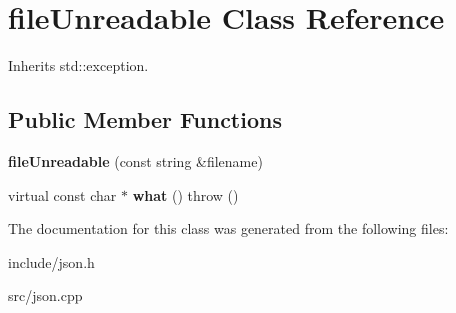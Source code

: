 \hypertarget{classfileUnreadable}{\section{file\-Unreadable \-Class \-Reference}
\label{classfileUnreadable}
}


\-Inherits std\-::exception.

\subsection*{\-Public \-Member \-Functions}
\begin{DoxyCompactItemize}
\item 
\hypertarget{classfileUnreadable_aa9b868ff8dc3d708a72eeb3de8f663f3}{{\bfseries file\-Unreadable} (const string \&filename)}\label{classfileUnreadable_aa9b868ff8dc3d708a72eeb3de8f663f3}

\item 
\hypertarget{classfileUnreadable_aa3c09e78f15e2091c2eca10b3d4cf86c}{virtual const char $\ast$ {\bfseries what} ()  throw ()}\label{classfileUnreadable_aa3c09e78f15e2091c2eca10b3d4cf86c}

\end{DoxyCompactItemize}


\-The documentation for this class was generated from the following files\-:\begin{DoxyCompactItemize}
\item 
include/json.\-h\item 
src/json.\-cpp\end{DoxyCompactItemize}
